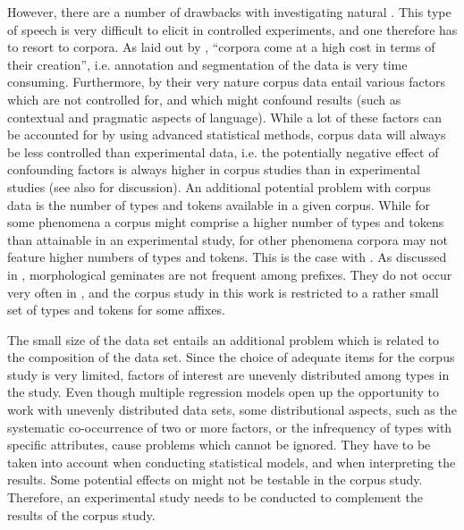 However, there are a number of drawbacks with investigating natural . This type of speech is very difficult to elicit in controlled experiments, and one therefore has to resort to corpora. As laid out by \citet[21]{Tucker.2016}, ``corpora come at a high cost in terms of their creation'', i.e. annotation and segmentation of the data is very time consuming. 
Furthermore, by their very nature corpus data entail various factors which are not controlled for, and which might confound results (such as contextual and pragmatic aspects of language). While a lot of these factors can be accounted for by using advanced statistical methods, corpus data will always be less controlled than experimental data, i.e. the potentially negative effect of confounding factors is always higher in corpus studies than in experimental studies (see also \citealt[144]{Kunter.13.04.2017} for discussion).
An additional potential problem with corpus data is the number of types and tokens available in a given corpus. While for some phenomena a corpus might comprise a higher number of types and tokens than attainable in an experimental study, for other phenomena corpora may not feature higher numbers of types and tokens. This is the case with . As discussed in , morphological geminates are not frequent among prefixes. They do not occur very often in , and the corpus study in this work is restricted to a rather small set of types and tokens for some affixes. 

The small size of the data set entails an additional problem which is related to the composition of the data set. Since the choice of adequate items for the  corpus study is very limited, factors of interest are unevenly distributed among types in the study. Even though multiple regression models open up the opportunity to work with unevenly distributed data sets, some distributional aspects, such as the systematic co-occurrence of two or more factors, or the infrequency of types with specific attributes, cause problems which cannot be ignored.  They have to be taken into account when conducting statistical models, and when interpreting the results. Some potential effects on  might not be testable in the corpus study. Therefore, an experimental study needs to be conducted to complement the results of the corpus study.



